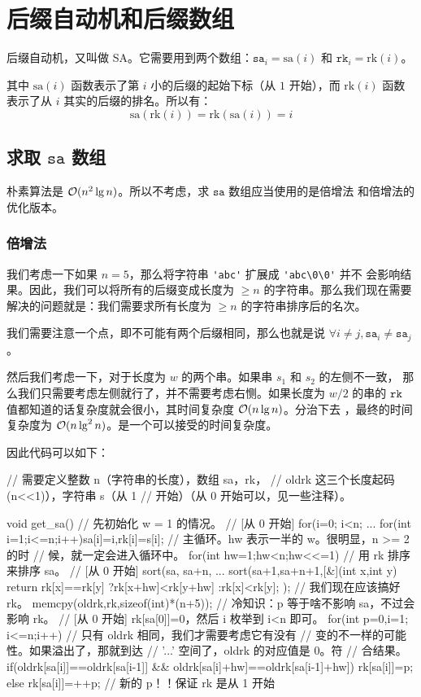 \section{后缀自动机和后缀数组} \label{sec:后缀自动机和后缀数组}
后缀自动机，又叫做 SA。它需要用到两个数组：$\mathtt{sa}_i = \mathrm{sa}(i)$ 和
$\mathtt{rk}_i = \mathrm{rk}(i)$。

其中 $\mathrm{sa}(i)$ 函数表示了第 $i$ 小的后缀的起始下标（从 $1$ 开始），而
$\mathrm{rk}(i)$ 函数表示了从 $i$ 其实的后缀的排名。所以有：
$$
\mathrm{sa}(\mathrm{rk}(i)) = \mathrm{rk}(\mathrm{sa}(i)) = i
$$

\subsection{求取 $\mathtt{sa}$ 数组}
朴素算法是 $\mathcal{O}(n^2\lg n)$。所以不考虑，求 $\mathtt{sa}$ 数组应当使用的是倍增法
和倍增法的优化版本。

\subsubsection{倍增法}
我们考虑一下如果 $n = 5$，那么将字符串 \verb|'abc'| 扩展成 \verb|'abc\0\0'| 并不
会影响结果。因此，我们可以将所有的后缀变成长度为 $\ge n$ 的字符串。那么我们现在需要
解决的问题就是：我们需要求所有长度为 $\ge n$ 的字符串排序后的名次。

我们需要注意一个点，即不可能有两个后缀相同，那么也就是说 $\forall i \neq j,
\mathtt{sa}_i \neq \mathtt{sa}_j$。

然后我们考虑一下，对于长度为 $w$ 的两个串。如果串 $s_1$ 和 $s_2$ 的左侧不一致，
那么我们只需要考虑左侧就行了，并不需要考虑右恻。如果长度为 $w / 2$ 的串的
$\mathtt{rk}$ 值都知道的话复杂度就会很小，其时间复杂度 $\mathcal{O}(n \lg n)$。分治下去
，最终的时间复杂度为 $\mathcal{O}(n \lg^2 n)$。是一个可以接受的时间复杂度。

因此代码可以如下：
\begin{Cpp}
// 需要定义整数 n（字符串的长度），数组 sa，rk，
// oldrk 这三个长度起码 (n<<1)），字符串 s（从 1
// 开始）（从 0 开始可以，见一些注释）。

void get_sa(){
  // 先初始化 w = 1 的情况。
  // [从 0 开始] for(i=0; i<n; ...
  for(int i=1;i<=n;i++)sa[i]=i,rk[i]=s[i];
  // 主循环。hw 表示一半的 w。很明显，n >= 2 的时
  // 候，就一定会进入循环中。
  for(int hw=1;hw<n;hw<<=1){ 
    // 用 rk 排序来排序 sa。
    // [从 0 开始] sort(sa, sa+n, ...
    sort(sa+1,sa+n+1,[&](int x,int y){
      return rk[x]==rk[y]
        ?rk[x+hw]<rk[y+hw]
        :rk[x]<rk[y];
    });
    // 我们现在应该搞好 rk。
    memcpy(oldrk,rk,sizeof(int)*(n+5));
    // 冷知识：p 等于啥不影响 sa，不过会影响 rk。
    // [从 0 开始] rk[sa[0]]=0，然后 i 枚举到 i<n 即可。
    for(int p=0,i=1; i<=n;i++){
      // 只有 oldrk 相同，我们才需要考虑它有没有
      // 变的不一样的可能性。如果溢出了，那就到达
      // '\0\0...' 空间了，oldrk 的对应值是 0。符
      // 合结果。
      if(oldrk[sa[i]]==oldrk[sa[i-1]] &&
        oldrk[sa[i]+hw]==oldrk[sa[i-1]+hw]){
        rk[sa[i]]=p;
      }else{
        rk[sa[i]]=++p; // 新的 p！！保证 rk 是从 1 开始
      }
    }
  }
}
\end{Cpp}

